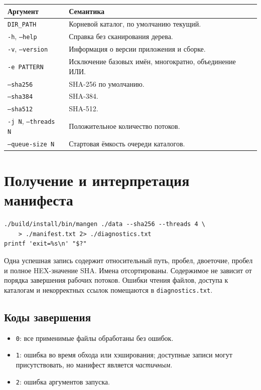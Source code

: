 \documentclass[12pt,a4paper]{article}
\begin{document}
\begin{longtable}{P{0.28\textwidth}P{0.62\textwidth}}
\toprule
Аргумент & Семантика \\
\midrule
\endhead
\texttt{DIR\_PATH} & Корневой каталог, по умолчанию текущий. \\
\texttt{-h}, \texttt{--help} & Справка без сканирования дерева. \\
\texttt{-v}, \texttt{--version} & Информация о версии приложения и сборке. \\
\texttt{-e PATTERN} & Исключение базовых имён, многократно, объединение ИЛИ. \\
\texttt{--sha256} & SHA-256 по умолчанию. \\
\texttt{--sha384} & SHA-384. \\
\texttt{--sha512} & SHA-512. \\
\texttt{-j N}, \texttt{--threads N} & Положительное количество потоков. \\
\texttt{--queue-size N} & Стартовая ёмкость очереди каталогов. \\
\bottomrule
\end{longtable}

\section{Получение и интерпретация манифеста}

\begin{lstlisting}
./build/install/bin/mangen ./data --sha256 --threads 4 \
    > ./manifest.txt 2> ./diagnostics.txt
printf 'exit=%s\n' "$?"
\end{lstlisting}

Одна успешная запись содержит относительный путь, пробел, двоеточие, пробел
и полное HEX-значение SHA. Имена отсортированы. Содержимое не зависит от
порядка завершения рабочих потоков. Ошибки чтения файлов, доступа к каталогам
и некорректных ссылок помещаются в \texttt{diagnostics.txt}.

\subsection{Коды завершения}

\begin{itemize}
\item \texttt{0}: все применимые файлы обработаны без ошибок.
\item \texttt{1}: ошибка во время обхода или хэширования; доступные записи
могут присутствовать, но манифест является \emph{частичным}.
\item \texttt{2}: ошибка аргументов запуска.
\end{itemize}
\end{document}
